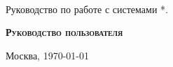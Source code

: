 \begin{titlepage}
\newpage
\clearpage\maketitle
\thispagestyle{empty}

\begin{center}
\CompanyName \\
\vspace{0.1cm}
\hrulefill
\end{center}
 

\vspace{8em}

\begin{center}
\Large Руководство по работе с системами *.\MainDomain
\end{center}

\vspace{2.5em}
 
\begin{center}
\textsc{\textbf{Руководство пользователя}}
\end{center}

\vspace{6em}
 

 
\vspace{\fill}

\begin{center}
Москва, \today
\end{center}

\end{titlepage}


